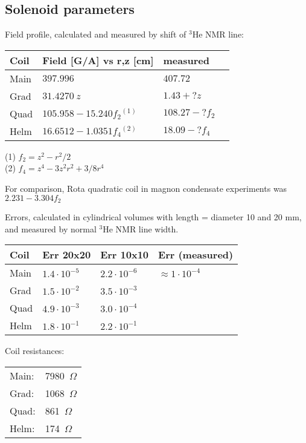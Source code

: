 \documentclass[a4paper]{article}
\begin{document}


\subsection*{Solenoid parameters}

Field profile, calculated and measured by shift of $^3$He NMR line:

\medskip
\begin{tabular}{llll}
Coil  &  Field [G/A] vs r,z [cm] & measured\\\hline
Main   &  $397.996$                       & $407.72$\\
Grad   &  $31.4270\ z$                    & $1.43 + ? z$\\
Quad   &  $105.958 - 15.240 f_2$$^{(1)}$  & $108.27 - ? f_2$\\
Helm   &  $16.6512 - 1.0351 f_4$$^{(2)}$  & $18.09 - ? f_4$\\
\end{tabular}

\noindent
(1) $f_2 = z^2-r^2/2$\\
(2) $f_4 = z^4 - 3 z^2 r^2 + 3/8 r^4$
\medskip

For comparison, Rota quadratic coil in magnon condensate experiments was $2.231 - 3.304 f_2$


Errors, calculated in cylindrical volumes with length = diameter 10 and 20 mm,
and measured by normal $^3$He NMR line width.

\medskip
\begin{tabular}{llll}
Coil   & Err 20x20 & Err 10x10 & Err (measured) \\\hline
Main   & $1.4\cdot10^{-5}$ & $2.2\cdot10^{-6}$ & $\approx1\cdot10^{-4}$\\
Grad   & $1.5\cdot10^{-2}$ & $3.5\cdot10^{-3}$ & \\
Quad   & $4.9\cdot10^{-3}$ & $3.0\cdot10^{-4}$ & \\
Helm   & $1.8\cdot10^{-1}$ & $2.2\cdot10^{-1}$ & \\
\end{tabular}
\medskip

Coil resistances:

\medskip
\begin{tabular}{ll}\hline
Main: & 7980~$\Omega$\\
Grad: & 1068~$\Omega$\\
Quad: & 861~$\Omega$\\
Helm: & 174~$\Omega$\\
\end{tabular}
\medskip
\end{document}
